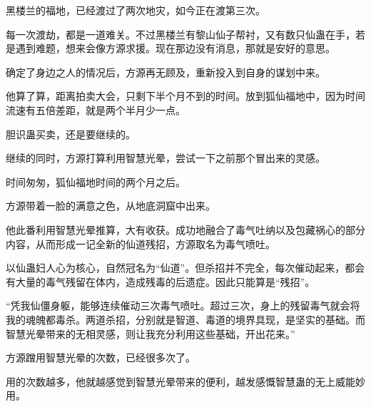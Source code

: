 \begin{this_body}
黑楼兰的福地，已经渡过了两次地灾，如今正在渡第三次。

每一次渡劫，都是一道难关。不过黑楼兰有黎山仙子帮衬，又有数只仙蛊在手，若是遇到难题，想来会像方源求援。现在那边没有消息，那就是安好的意思。

确定了身边之人的情况后，方源再无顾及，重新投入到自身的谋划中来。

他算了算，距离拍卖大会，只剩下半个月不到的时间。放到狐仙福地中，因为时间流速有五倍差距，就是两个半月少一点。

胆识蛊买卖，还是要继续的。

继续的同时，方源打算利用智慧光晕，尝试一下之前那个冒出来的灵感。

时间匆匆，狐仙福地时间的两个月之后。

方源带着一脸的满意之色，从地底洞窟中出来。

他此番利用智慧光晕推算，大有收获。成功地融合了毒气吐纳以及包藏祸心的部分内容，从而形成一记全新的仙道残招，方源取名为毒气喷吐。

以仙蛊妇人心为核心，自然冠名为“仙道”。但杀招并不完全，每次催动起来，都会有大量的毒气残留在体内，造成残毒的后遗症。因此只能算是“残招”。

“凭我仙僵身躯，能够连续催动三次毒气喷吐。超过三次，身上的残留毒气就会将我的魂魄都毒杀。两道杀招，分别就是智道、毒道的境界具现，是坚实的基础。而智慧光晕带来的无相灵感，则让我充分利用这些基础，开出花来。”

方源蹭用智慧光晕的次数，已经很多次了。

用的次数越多，他就越感觉到智慧光晕带来的便利，越发感慨智慧蛊的无上威能妙用。

\end{this_body}

